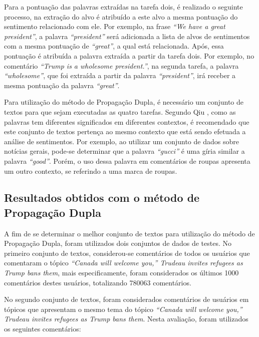 Para a pontuação das palavras extraídas na tarefa dois, é realizado o seguinte
processo, na extração do alvo é atribuído a este alvo a mesma pontuação do
sentimento relacionado com ele. Por exemplo, na frase \textit{``We have a great
president''}, a palavra \textit{``president''} será adicionada a lista de alvos
de sentimentos com a mesma pontuação de \textit{``great''}, a qual está
relacionada. Após, essa pontuação é atribuída a palavra extraída a partir
da tarefa dois.
Por exemplo, no comentário \textit{``Trump is a wholesome president.''}, na
segunda tarefa, a palavra \textit{``wholesome''}, que foi extraída a partir da
palavra \textit{``president''}, irá receber a mesma pontuação da palavra
\textit{``great''}.

Para utilização do método de Propagação Dupla, é necessário um
conjunto de textos para que sejam executadas as quatro tarefas. Segundo Qiu
\cite{Qiu:2011:OWE:1970420.1970422}, como as palavras tem diferentes
significados em diferentes contextos, é recomendado que este conjunto de textos
pertença ao mesmo contexto que está sendo efetuada a análise de sentimentos. Por
exemplo, ao utilizar um conjunto de dados sobre notícias gerais, pode-se
determinar que a palavra \textit{``gucci''} é uma gíria similar a palavra
\textit{``good''}. Porém, o uso dessa palavra em comentários de roupas
apresenta um outro contexto, se referindo a uma marca de roupas.

\subsection{Resultados obtidos com o método de Propagação Dupla}

A fim de se determinar o melhor conjunto de textos para utilização do método de
Propagação Dupla, foram utilizados dois conjuntos de dados de testes. No
primeiro conjunto de textos, considerou-se comentários de todos os usuários que
comentaram o tópico \textit{``Canada will welcome you,” Trudeau invites
refugees as Trump bans them}, mais especificamente, foram considerados os
últimos 1000 comentários destes usuários, totalizando 780063 comentários.

No segundo
conjunto de textos, foram considerados comentários de usuários em tópicos
que apresentam o mesmo tema do tópico \textit{``Canada will welcome you,” Trudeau invites
refugees as Trump bans them}. Nesta avaliação, foram utilizados os
seguintes comentários:

